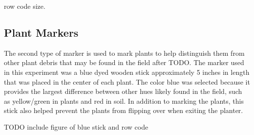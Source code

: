 row code size.

\subsection{Plant Markers}

The second type of marker is used to mark plants to help distinguish them from other plant debris that may be found in the field after TODO.  The marker used in this experiment was a blue dyed wooden stick approximately 5 inches in length that was placed in the center of each plant. The color blue was selected because it provides the largest difference between other hues likely found in the field, such as yellow/green in plants and red in soil.  In addition to marking the plants, this stick also helped prevent the plants from flipping over when exiting the planter.

TODO include figure of blue stick and row code
